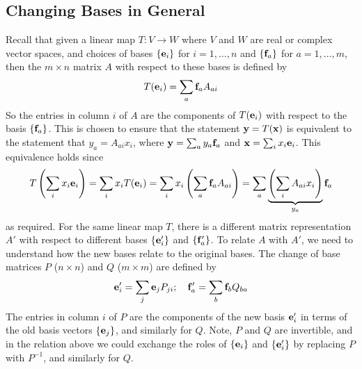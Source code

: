\documentclass{article}
\begin{document}
\subsection{Changing Bases in General}
Recall that given a linear map $T\colon V \to W$ where $V$ and $W$ are real or complex vector spaces, and choices of bases $\{ \vb e_i \}$ for $i = 1, \dots, n$ and $\{\vb f_a \}$ for $a = 1, \dots, m$, then the $m \times n$ matrix $A$ with respect to these bases is defined by
\[ T(\vb e_i) = \sum_a \vb f_a A_{ai} \]
So the entries in column $i$ of $A$ are the components of $T(\vb e_i)$ with respect to the basis $\{ \vb f_a \}$. This is chosen to ensure that the statement $\vb y = T(\vb x)$ is equivalent to the statement that $y_a = A_{ai}x_i$, where $\vb y = \sum_a y_a \vb f_a$ and $\vb x = \sum_i x_i \vb e_i$. This equivalence holds since
\[ T\left(\sum_i x_i \vb e_i \right) = \sum_i x_i T(\vb e_i) = \sum_i x_i \left( \sum_a \vb f_a A_{ai} \right) = \sum_a \underbrace{\left( \sum_i A_{ai} x_i \right)}_{y_a} \vb f_a \]
as required. For the same linear map $T$, there is a different matrix representation $A'$ with respect to different bases $\{ \vb e'_i \}$ and $\{ \vb f'_a \}$. To relate $A$ with $A'$, we need to understand how the new bases relate to the original bases. The change of base matrices $P$ ($n \times n$) and $Q$ ($m \times m$) are defined by
\[ \vb e_i' = \sum_j \vb e_j P_{ji};\quad \vb f_a' = \sum_b \vb f_b Q_{ba} \]
The entries in column $i$ of $P$ are the components of the new basis $\vb e_i'$ in terms of the old basis vectors $\{ \vb e_j \}$, and similarly for $Q$. Note, $P$ and $Q$ are invertible, and in the relation above we could exchange the roles of $\{ \vb e_i \}$ and $\{ \vb e'_i \}$ by replacing $P$ with $P^{-1}$, and similarly for $Q$.
\end{document}
